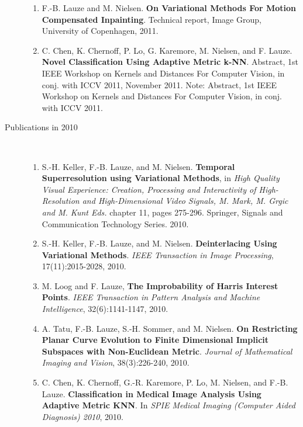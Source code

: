 \documentclass[10pt]{article}
\begin{document}
\begin{description}
\begin{enumerate}
  \item F.-B. Lauze and M. Nielsen.  \textbf{On Variational Methods For Motion Compensated
      Inpainting}.  Technical report, Image Group, University of Copenhagen, 2011.

  \item C. Chen, K. Chernoff, P. Lo, G. Karemore, M. Nielsen, and F. Lauze.  \textbf{Novel
      Classification Using Adaptive Metric k-NN}.  Abstract, 1st IEEE Workshop on Kernels
    and Distances For Computer Vision, in conj. with ICCV 2011, November 2011.  Note:
    Abstract, 1st IEEE Workshop on Kernels and Distances For Computer Vision, in
    conj. with ICCV 2011.

  \end{enumerate}

\item[Publications in 2010]~\\
  \begin{enumerate}
  
  \item S.-H. Keller, F.-B. Lauze, and M. Nielsen.  \textbf{Temporal Superresolution using
      Variational Methods}, in \textit{ High Quality Visual Experience: Creation,
      Processing and Interactivity of High-Resolution and High-Dimensional Video Signals,
      M. Mark, M. Grgic and M. Kunt Eds.  }chapter 11, pages 275-296.  Springer, Signals
    and Communication Technology Series.  2010.

  \item S.-H. Keller, F.-B. Lauze, and M. Nielsen.  \textbf{Deinterlacing Using
      Variational Methods}.  \textit{IEEE Transaction in Image Processing},
    17(11):2015-2028, 2010.

  \item M. Loog and F. Lauze, \textbf{The Improbability of Harris Interest Points}.
    \textit{IEEE Transaction in Pattern Analysis and Machine Intelligence},
    32(6):1141-1147, 2010.

  \item A. Tatu, F.-B. Lauze, S.-H. Sommer, and M. Nielsen.  \textbf{On Restricting Planar
      Curve Evolution to Finite Dimensional Implicit Subspaces with Non-Euclidean Metric}.
    \textit{Journal of Mathematical Imaging and Vision}, 38(3):226-240, 2010.

  \item C. Chen, K. Chernoff, G.-R. Karemore, P. Lo, M. Nielsen, and F.-B. Lauze.
    \textbf{Classification in Medical Image Analysis Using Adaptive Metric KNN}.  In
    \textit{SPIE Medical Imaging (Computer Aided Diagnosis) 2010}, 2010.


\end{enumerate}
\end{description}
\end{document}
